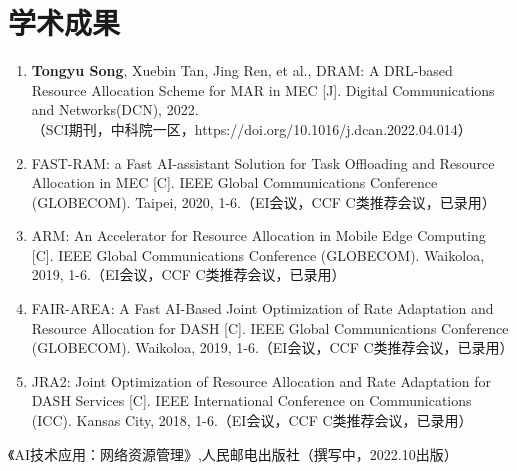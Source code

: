 \documentclass{resume}
\begin{document}
\section{学术成果}
\begin{enumerate}
  \item \textbf{Tongyu Song}, Xuebin Tan, Jing Ren, et al., DRAM: A DRL-based Resource Allocation Scheme for MAR in MEC [J].
  Digital Communications and Networks(DCN), 2022.\\（SCI期刊，中科院一区，https://doi.org/10.1016/j.dcan.2022.04.014）
  \item FAST-RAM: a Fast AI-assistant Solution for Task Offloading and Resource Allocation in MEC [C]. IEEE Global Communications Conference (GLOBECOM). Taipei, 2020, 1-6.（EI会议，CCF C类推荐会议，已录用）
  \item ARM: An Accelerator for Resource Allocation in Mobile Edge Computing [C]. IEEE Global Communications Conference (GLOBECOM). Waikoloa, 2019, 1-6.（EI会议，CCF C类推荐会议，已录用）
  \item FAIR-AREA: A Fast AI-Based Joint Optimization of Rate Adaptation and Resource Allocation for DASH [C]. IEEE Global Communications Conference (GLOBECOM). Waikoloa, 2019, 1-6.（EI会议，CCF C类推荐会议，已录用）
  \item JRA2: Joint Optimization of Resource Allocation and Rate Adaptation for DASH Services [C]. IEEE International Conference on Communications (ICC). Kansas City, 2018, 1-6.（EI会议，CCF C类推荐会议，已录用）
\end{enumerate}
《AI技术应用：网络资源管理》,人民邮电出版社（撰写中，2022.10出版）
\end{document}
